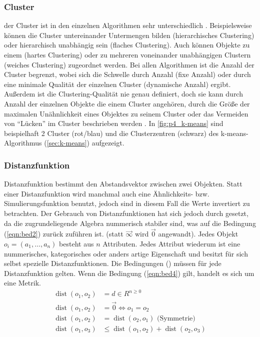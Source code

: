 \documentclass[12pt,journal,compsoc,ngerman]{IEEEtran}
\DeclareMathOperator{\dist}{dist}
\begin{document}
\subsubsection{Cluster} \label{sec:cluster}

 der Cluster ist in den einzelnen Algorithmen sehr unterschiedlich \cite{ester2000knowledge}. Beispielsweise können die Cluster untereinander Untermengen bilden (hierarchisches Clustering) oder hierarchisch unabhängig sein (flaches Clustering). Auch können Objekte zu einem (hartes Clustering) oder zu mehreren voneinander unabhängigen Clustern (weiches Clustering) zugeordnet werden. Bei allen Algorithmen ist die Anzahl der Cluster begrenzt, wobei sich die Schwelle durch Anzahl (fixe Anzahl) oder durch eine minimale Qualität der einzelnen Cluster (dynamische Anzahl) ergibt. Außerdem ist die Clustering-Qualität nie genau definiert, doch sie kann durch Anzahl der einzelnen Objekte die einem Cluster angehören, durch die Größe der maximalen Unähnlichkeit eines Objektes zu seinem Cluster oder das Vermeiden von \enquote{Lücken} im Cluster beschrieben werden \cite{dwh}. In \cref{fig:p4_k-means} sind beispielhaft 2 Cluster (rot/blau) und die Clusterzentren (schwarz) des k-means-Algorithmus (\cref{sec:k-means}) aufgezeigt.

\subsubsection{Distanzfunktion} \label{sec:distanzfunktion}
 Distanzfunktion bestimmt den Abstandsvektor zwischen zwei Objekten. Statt einer Distanzfunktion
wird manchmal auch eine Ähnlichkeits- bzw. Simulierungsfunktion benutzt, jedoch sind in diesem
Fall die Werte invertiert zu betrachten. Der Gebrauch von Distanzfunktionen hat sich jedoch durch
gesetzt, da die zugrundeliegende Algebra nummerisch stabiler sind, was auf die Bedingung  (\cref{eqn:bed2}) zurück zuführen ist. (statt $\vec{\infty}$ wird $\vec{0}$ angewandt). Jedes Objekt $o_i = (a_1, \ldots, a_n)$ besteht aus $n$ Attributen. Jedes 
Attribut wiederum ist eine nummerisches, kategorisches oder anders artige Eigenschaft %
 und besitzt für sich selbst 
spezielle Distanzfunktionen. Die Bedingungen () müssen für jede 
Distanzfunktion gelten. Wenn die Bedingung (\cref{eqn:bed4}) gilt, handelt es sich um eine Metrik.
\begin{align}
\dist(o_1, o_2) &= d \in R^{n\geq 0} \label{eqn:bed1}\\
\dist(o_1, o_2) &= \vec{0} \Leftrightarrow o_1 = o_2 \label{eqn:bed2}\\
\dist(o_1, o_2) &= \dist(o_2, o_1) \mbox{ (Symmetrie)} \label{eqn:bed3}\\
\dist(o_1, o_3) &\leq \dist(o_1, o_2) + \dist(o_2, o_3) \label{eqn:bed4}
\end{align} 
\end{document}
